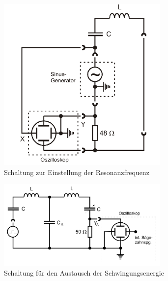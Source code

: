 \begin{figure}
    \centering
    \includegraphics[width=0.75\textwidth]{plots/Schaltung0.png}
    \caption{Schaltung zur Einstellung der Resonanzfrequenz \cite{v355}}
    \label{fig:schaltung0}
\end{figure}

\begin{figure}
    \centering
    \includegraphics[width=0.75\textwidth]{plots/Schaltung1.png}
    \caption{Schaltung für den Austausch der Schwingungsenergie \cite{v355}}
    \label{fig:schaltung1}
\end{figure}